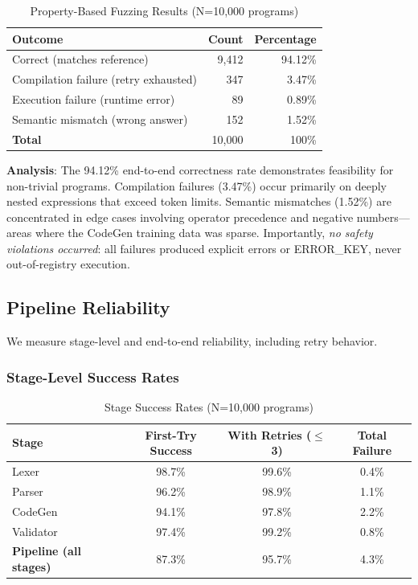 \documentclass[11pt,a4paper]{article}
\begin{document}
\begin{table}[H]
\centering
\caption{Property-Based Fuzzing Results (N=10,000 programs)}
\label{tab:fuzzing}
\begin{tabular}{@{}lrr@{}}
\toprule
\textbf{Outcome} & \textbf{Count} & \textbf{Percentage} \\
\midrule
Correct (matches reference) & 9,412 & 94.12\% \\
Compilation failure (retry exhausted) & 347 & 3.47\% \\
Execution failure (runtime error) & 89 & 0.89\% \\
Semantic mismatch (wrong answer) & 152 & 1.52\% \\
\midrule
\textbf{Total} & 10,000 & 100\% \\
\bottomrule
\end{tabular}
\end{table}

\textbf{Analysis}: The 94.12\% end-to-end correctness rate demonstrates feasibility for non-trivial programs. Compilation failures (3.47\%) occur primarily on deeply nested expressions that exceed token limits. Semantic mismatches (1.52\%) are concentrated in edge cases involving operator precedence and negative numbers---areas where the CodeGen training data was sparse. Importantly, \textit{no safety violations occurred}: all failures produced explicit errors or ERROR\_KEY, never out-of-registry execution.

\subsection{Pipeline Reliability}

We measure stage-level and end-to-end reliability, including retry behavior.

\subsubsection{Stage-Level Success Rates}

\begin{table}[H]
\centering
\caption{Stage Success Rates (N=10,000 programs)}
\label{tab:stage-reliability}
\begin{tabular}{@{}lccc@{}}
\toprule
\textbf{Stage} & \textbf{First-Try Success} & \textbf{With Retries ($\leq$3)} & \textbf{Total Failure} \\
\midrule
Lexer & 98.7\% & 99.6\% & 0.4\% \\
Parser & 96.2\% & 98.9\% & 1.1\% \\
CodeGen & 94.1\% & 97.8\% & 2.2\% \\
Validator & 97.4\% & 99.2\% & 0.8\% \\
\midrule
\textbf{Pipeline (all stages)} & 87.3\% & 95.7\% & 4.3\% \\
\bottomrule
\end{tabular}
\end{table}
\end{document}
